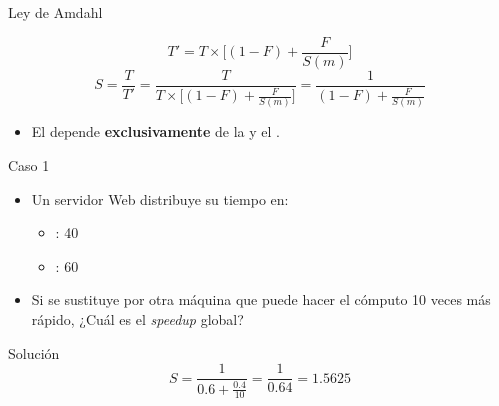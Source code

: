 \begin{frame}[t]{Ley de Amdahl}
\begin{small}
\begin{displaymath}
T'=T \times \Big[ (1 - F) + \frac{F}{S(m)} \Big]
\end{displaymath}
\begin{displaymath}
S=\frac{T}{T'}=
\frac{T}{T \times \Big[ (1 - F) + \frac{F}{S(m)} \Big]} =
\frac{1}{(1 - F) + \frac{F}{S(m)}}
\end{displaymath}
\end{small}
\begin{itemize}
  \item El  depende \textbf{exclusivamente} de
        la  y el .
\end{itemize}
\end{frame}

\begin{frame}[t]{Caso 1}
\begin{itemize}
  \item Un servidor Web distribuye su tiempo en:
    \begin{itemize}
      \item {}: 40%
      \item {}: 60%
    \end{itemize}
  \item Si se sustituye por otra máquina que puede hacer el 
        cómputo 10 veces más rápido, ¿Cuál es el \emph{speedup} global?
\end{itemize}
\begin{block}{Solución}
\begin{displaymath}
S=
\frac{1}{0.6+\frac{0.4}{10}} =
\frac{1}{0.64} =
1.5625
\end{displaymath}
\end{block}
\end{frame}

